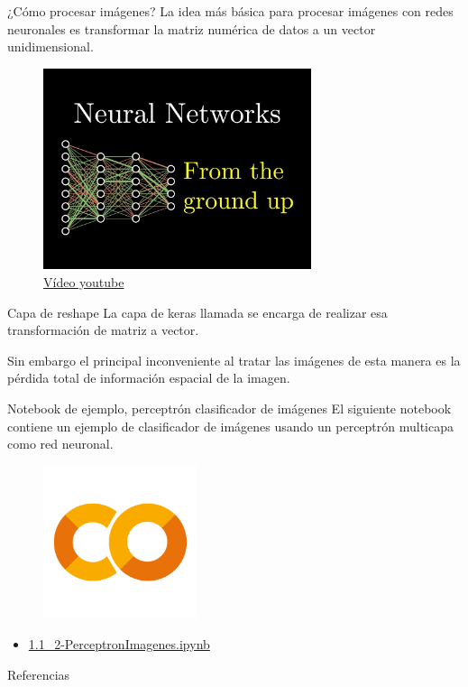\begin{frame}{¿Cómo procesar imágenes?}
La idea más \alert{básica} para procesar imágenes con redes neuronales es  transformar la \alert{matriz numérica} de datos a un \alert{vector unidimensional}.

\begin{figure}
    \centering
    \includegraphics[width=0.7\textwidth]{Slides/figures/Tema 3/NNVideo.jpg}
    \caption{\href{https://www.youtube.com/watch?v=aircAruvnKk&t=218s}{Vídeo youtube}}
\end{figure}
\end{frame}

\begin{frame}{Capa de reshape}
La capa de \alert{keras} llamada  se encarga de realizar esa transformación de \alert{matriz} a \alert{vector}.

Sin embargo el principal \alert{inconveniente} al tratar las imágenes de esta manera es la \alert{pérdida total} de información espacial de la imagen.
\end{frame}


\begin{frame}{Notebook de ejemplo, perceptrón clasificador de imágenes}
El siguiente notebook contiene un ejemplo de clasificador de imágenes usando un perceptrón multicapa como red neuronal.

\begin{figure}
    \centering
    \includegraphics[width=0.4\textwidth]{Slides/figures/GoogleColab.png}
\end{figure}
\begin{itemize}
    \centering
    \item {\Large \href{https://colab.research.google.com/drive/1h2cas9zCyUsutVJrJwR43zJMzOurunoV?usp=sharing}{1.1\_2-PerceptronImagenes.ipynb}}
\end{itemize}
\end{frame}

\begin{frame}[allowframebreaks]{Referencias}
    
    
\end{frame}


